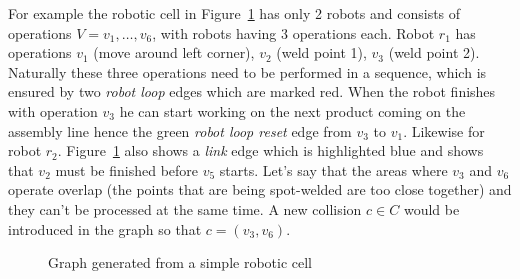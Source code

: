 For example the robotic cell in Figure~\ref{fig:examplegraph} has only 2 robots and consists of operations $V = v_1, \dots, v_6$, with robots having 3 operations each. 
Robot $r_1$ has operations $v_1$ (move around left corner), $v_2$ (weld point 1), $v_3$ (weld point 2). 
Naturally these three operations need to be performed in a sequence, which is ensured by two  \emph{robot loop} edges which are marked red. 
When the robot finishes with operation $v_3$ he can start working on the next product coming on the assembly line hence the green \emph{robot loop reset} edge from $v_3$ to $v_1$.
Likewise for robot $r_2$. 
Figure~\ref{fig:examplegraph} also shows a \emph{link} edge which is highlighted blue and shows that $v_2$ must be finished before $v_5$ starts.
Let's say that the areas where $v_3$ and $v_6$ operate overlap (the points that are being spot-welded are too close together) and they can't be processed at the same time.
A new collision $c \in C$ would be introduced in the graph so that $c = (v_3, v_6)$.

\begin{figure}[H]
    \centering
    
    \caption{Graph generated from a simple robotic cell}
    \label{fig:examplegraph}
\end{figure}
